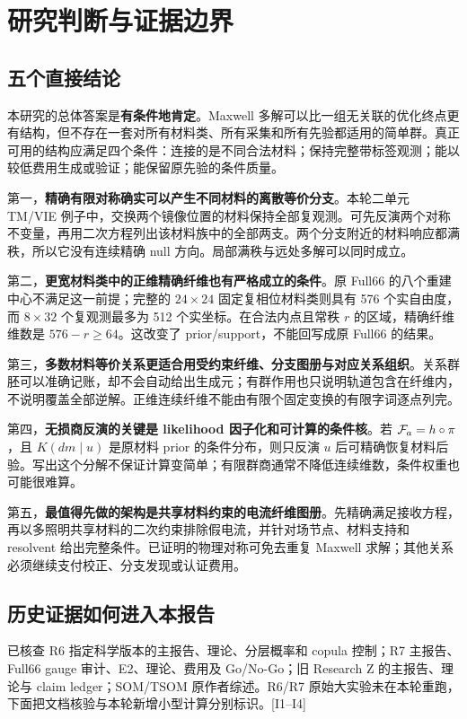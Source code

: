 \section{研究判断与证据边界}

\subsection{五个直接结论}

本研究的总体答案是\textbf{有条件地肯定}。Maxwell 多解可以比一组无关联的优化终点更有结构，但不存在一套对所有材料类、所有采集和所有先验都适用的简单群。真正可用的结构应满足四个条件：连接的是不同合法材料；保持完整带标签观测；能以较低费用生成或验证；能保留原先验的条件质量。

第一，\textbf{精确有限对称确实可以产生不同材料的离散等价分支}。本轮二单元 TM/VIE 例子中，交换两个镜像位置的材料保持全部复观测。可先反演两个对称不变量，再用二次方程列出该材料族中的全部两支。两个分支附近的材料响应都满秩，所以它没有连续精确 null 方向。局部满秩与远处多解可以同时成立。

第二，\textbf{更宽材料类中的正维精确纤维也有严格成立的条件}。原 Full66 的八个重建中心不满足这一前提；完整的 $24\times24$ 固定复相位材料类则具有 576 个实自由度，而 $8\times32$ 个复观测最多为 512 个实坐标。在合法内点且常秩 $r$ 的区域，精确纤维维数是 $576-r\ge64$。这改变了 prior/support，不能回写成原 Full66 的结果。

第三，\textbf{多数材料等价关系更适合用受约束纤维、分支图册与对应关系组织}。关系群胚可以准确记账，却不会自动给出生成元；有群作用也只说明轨道包含在纤维内，不说明覆盖全部逆解。正维连续纤维不能由有限个固定变换的有限字词逐点列完。

第四，\textbf{无损商反演的关键是 likelihood 因子化和可计算的条件核}。若 ${\mathcal F_a}=h\circ\pi$，且 $K(dm\mid u)$ 是原材料 prior 的条件分布，则只反演 $u$ 后可精确恢复材料后验。写出这个分解不保证计算变简单；有限群商通常不降低连续维数，条件权重也可能很难算。

第五，\textbf{最值得先做的架构是共享材料约束的电流纤维图册}。先精确满足接收方程，再以多照明共享材料的二次约束排除假电流，并针对场节点、材料支持和 resolvent 给出完整条件。已证明的物理对称可免去重复 Maxwell 求解；其他关系必须继续支付校正、分支发现或认证费用。

\subsection{历史证据如何进入本报告}

已核查 R6 指定科学版本的主报告、理论、分层概率和 copula 控制；R7 主报告、Full66 gauge 审计、E2、理论、费用及 Go/No-Go；旧 Research Z 的主报告、理论与 claim ledger；SOM/TSOM 原作者综述。R6/R7 原始大实验未在本轮重跑，下面把文档核验与本轮新增小型计算分别标识。[I1--I4]

